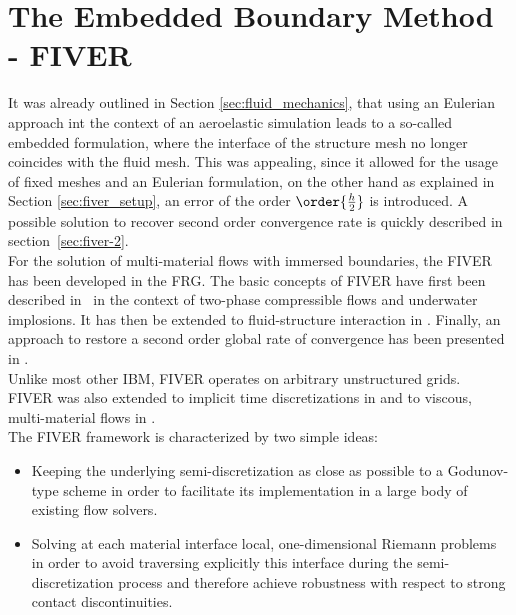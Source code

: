 \documentclass[../main.tex]{subfiles}
\begin{document}
\setlength{\delimitershortfall}{0pt}
\section{The Embedded Boundary Method - FIVER}\label{sec:embedded_boundary_method}
\secttoc
\sectlof
\sectlot


It was already outlined in Section \ref{sec:fluid_mechanics}, that using an Eulerian approach int the context of an aeroelastic simulation leads to a so-called embedded formulation, where the interface of the structure mesh no longer coincides with the fluid mesh. This was appealing, since it allowed for the usage of fixed meshes and an Eulerian formulation, on the other hand as  explained in Section \ref{sec:fiver_setup}, an error of the order $\order{\frac{h}{2}}$ is introduced. A possible solution to recover second order convergence rate is quickly described in section~\ref{sec:fiver-2}.\\
For the solution of multi-material flows with immersed boundaries, the \acf{FIVER} has been developed in the \acf{FRG}. The basic concepts of \ac{FIVER} have first been described in~\cite{Farhat2008} in the context of two-phase compressible flows and underwater implosions. It has then be extended to fluid-structure interaction in \cite{Wang2011a}. Finally, an approach to restore a second order global rate of convergence has been presented in \cite{Main2014}.\\
Unlike most other \ac{IBM}, \ac{FIVER} operates on arbitrary unstructured grids.\\
\ac{FIVER} was also extended to implicit time discretizations in \cite{Main2014a} and to viscous, multi-material flows in \cite{Farhat2014}.\\
The \ac{FIVER} framework is characterized by two simple ideas:
\begin{itemize}
\item Keeping the underlying semi-discretization as close as possible to a Godunov-type scheme in order to facilitate its implementation in a large body of existing flow solvers.
\item Solving at each material interface local, one-dimensional Riemann problems in order to avoid traversing explicitly this interface during the semi-discretization process and therefore achieve robustness with respect to strong contact discontinuities.
\end{itemize}
\end{document}
